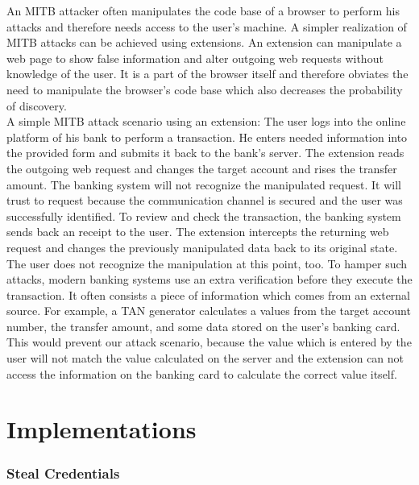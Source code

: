	An MITB attacker often manipulates the code base of a browser to perform his attacks and therefore needs access to the user's machine. A simpler realization of MITB attacks can be achieved using extensions. An extension can manipulate a web page to show false information and alter outgoing web requests without knowledge of the user. It is a part of the browser itself and therefore obviates the need to manipulate the browser's code base which also decreases the probability of discovery. \\
	
	A simple MITB attack scenario using an extension: The user logs into the online platform of his bank to perform a transaction. He enters needed information into the provided form and submits it back to the bank's server. The extension reads the outgoing web request and changes the target account and rises the transfer amount. The banking system will not recognize the manipulated request. It will trust to request because the communication channel is secured and the user was successfully identified. To review and check the transaction, the banking system sends back an receipt to the user. The extension intercepts the returning web request and changes the previously manipulated data back to its original state. The user does not recognize the manipulation at this point, too. To hamper such attacks, modern banking systems use an extra verification before they execute the transaction. It often consists a piece of information which comes from an external source. For example, a TAN generator calculates a values from the target account number, the transfer amount, and some data stored on the user's banking card. This would prevent our attack scenario, because the value which is entered by the user will not match the value calculated on the server and the extension can not access the information on the banking card to calculate the correct value itself. \\



\section{Implementations}



	\subsubsection{Steal Credentials}
	

